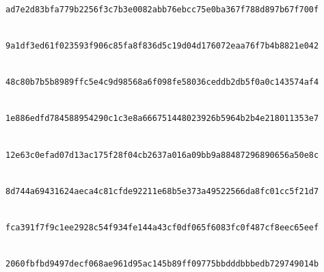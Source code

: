 \documentclass[pdflatex,sn-mathphys-num]{sn-jnl}%
\theoremstyle{thmstyleone}%
\theoremstyle{thmstyletwo}%
\theoremstyle{thmstylethree}%
\begin{document}
\begin{landscape}
\noindent{}\\
\texttt{ad7e2d83\allowbreak{}bfa779b2\allowbreak{}256f3c7b\allowbreak{}3e0082ab\allowbreak{}b76ebcc7\allowbreak{}5e0ba367\allowbreak{}f788d897\allowbreak{}b67f700f}\par
\noindent{}\\
\texttt{9a1df3ed\allowbreak{}61f02359\allowbreak{}3f906c85\allowbreak{}fa8f836d\allowbreak{}5c19d04d\allowbreak{}176072ea\allowbreak{}a76f7b4b\allowbreak{}8821e042}\par
\noindent{}\\
\texttt{48c80b7b\allowbreak{}5b8989ff\allowbreak{}c5e4c9d9\allowbreak{}8568a6f0\allowbreak{}98fe5803\allowbreak{}6ceddb2d\allowbreak{}b5f0a0c1\allowbreak{}43574af4}\par
\noindent{}\\
\texttt{1e886edf\allowbreak{}d7845889\allowbreak{}54290c1c\allowbreak{}3e8a6667\allowbreak{}51448023\allowbreak{}926b5964\allowbreak{}b2b4e218\allowbreak{}011353e7}\par
\noindent{}\\
\texttt{12e63c0e\allowbreak{}fad07d13\allowbreak{}ac175f28\allowbreak{}f04cb263\allowbreak{}7a016a09\allowbreak{}bb9a8848\allowbreak{}72968906\allowbreak{}56a50e8c}\par
\noindent{}\\
\texttt{8d744a69\allowbreak{}431624ae\allowbreak{}ca4c81cf\allowbreak{}de92211e\allowbreak{}68b5e373\allowbreak{}a4952256\allowbreak{}6da8fc01\allowbreak{}cc5f21d7}\par
\noindent{}\\
\texttt{fca391f7\allowbreak{}f9c1ee29\allowbreak{}28c54f93\allowbreak{}4fe144a4\allowbreak{}3cf0df06\allowbreak{}5f6083fc\allowbreak{}0f487cf8\allowbreak{}eec65eef}\par
\noindent{}\\
\texttt{2060fbfb\allowbreak{}d9497dec\allowbreak{}f068ae96\allowbreak{}1d95ac14\allowbreak{}5b89ff09\allowbreak{}775bbddd\allowbreak{}bbbedb72\allowbreak{}9749014b}\par
\noindent{}\\

\end{landscape}
\end{document}
